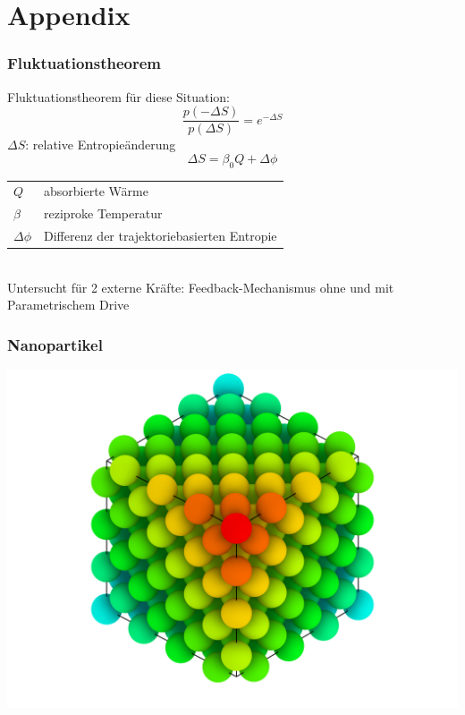\documentclass[handout]{beamer}
\begin{document}
\section*{Appendix}
\begin{frame}
\frametitle{Fluktuationstheorem}
Fluktuationstheorem für diese Situation:
\begin{equation}
    \label{eq:fluctuationtheorem}
    \frac{p(-\Delta S)}{p(\Delta S)} = e^{-\Delta S}
\end{equation}
$\Delta S$: relative Entropieänderung
\begin{equation}
    \Delta S = \beta_0 Q + \Delta \phi
\end{equation}
\begin{tabular}{l l}
$Q$ & absorbierte Wärme\\
$\beta$ & reziproke Temperatur\\
$\Delta \phi$ & Differenz der trajektoriebasierten Entropie
\end{tabular}\\
Untersucht für 2 externe Kräfte: Feedback-Mechanismus ohne und mit Parametrischem Drive
\end{frame}

\begin{frame}
\frametitle{Nanopartikel}
\begin{center}
\includegraphics[scale=0.2]{../images/fcc_rendering_layer_newcoloring.png}
\end{center}
\end{frame}
\end{document}
